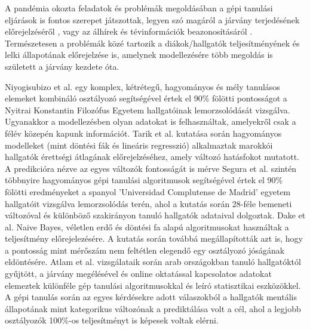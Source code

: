 \documentclass[12pt]{article}
\begin{document}

A pandémia okozta feladatok és problémák megoldásában a gépi tanulási eljárások is fontos szerepet játszottak, legyen szó magáról a járvány terjedésének előrejelzéséről \cite{mlr_1, mlr_2, student_perf4}, vagy az álhírek és tévinformációk beazonosításáról \cite{cov_solution3, cov_solution2, cov_solution}. Természetesen a problémák közé tartozik a diákok/hallgatók teljesítményének és lelki állapotának előrejelzése is, amelynek modellezésére több megoldás is született a járvány kezdete óta. 

Niyogisubizo et al. \cite{modeling1} egy komplex, kétrétegű, hagyományos és mély tanulásos elemeket kombináló osztályozó segítségével értek el 90\% fölötti pontosságot a Nyitrai Konstantin Filozófus Egyetem hallgatóinak lemorzsolódását vizsgálva. Ugyanakkor a modellezésben olyan adatokat is felhasználtak, amelyekről csak a félév közepén kapunk információt. Tarik et al. \cite{modeling3} kutatása során hagyományos modelleket (mint döntési fák és lineáris regresszió) alkalmaztak marokkói hallgatók érettségi átlagának előrejelzéséhez, amely változó hatásfokot mutatott. A predikcióra nézve az egyes változók fontosságát is mérve Segura et al. \cite{modeling2} szintén többnyire hagyományos gépi tanulási algoritmusok segítségével értek el 90\% fölötti eredményeket a spanyol 'Universidad Complutense de Madrid' egyetem hallgatóit vizsgálva lemorzsolódás terén, ahol a kutatás során 28-féle bemeneti változóval és különböző szakirányon tanuló hallgatók adataival dolgoztak. Dake et al. \cite{modeling4} Naive Bayes, véletlen erdő és döntési fa alapú algoritmusokat használtak a teljesítmény előrejelezésére. A kutatás során továbbá megállapították azt is, hogy a pontosság mint mérőszám nem feltétlen elegendő egy osztályozó jóságának eldöntésére. Atlam et al. \cite{student_perf3} vizsgálataik során arab országokban tanuló hallgatóktól gyűjtött, a járvány megélésével és online oktatással kapcsolatos adatokat elemeztek különféle gép tanulási algoritmusokkal és leíró statisztikai eszközökkel. A gépi tanulás során az egyes kérdésekre adott válaszokból a hallgatók mentális állapotának mint kategorikus változónak a prediktálása volt a cél, ahol a legjobb osztályozók 100\%-os teljesítményt is képesek voltak elérni.
\end{document}
